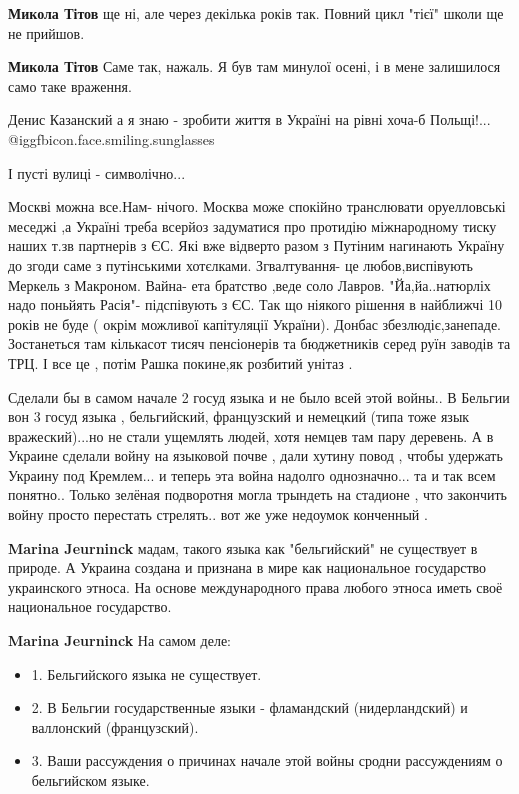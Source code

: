 \begin{itemize}
\begin{itemize} %
\textbf{Микола Тітов} ще ні, але через декілька років так. Повний цикл "тієї" школи ще не прийшов.

\textbf{Микола Тітов} Саме так, нажаль. Я був там минулої осені, і в мене залишилося само таке враження.
\end{itemize} %

Денис Казанский а я знаю - зробити життя в Україні на рівні хоча-б Польщі!... @igg{fbicon.face.smiling.sunglasses} 

І пусті вулиці - символічно...


\obeycr
Москві можна все.Нам- нічого.
Москва може спокійно транслювати оруелловські меседжі
,а Україні треба всерйоз задуматися про протидію міжнародному тиску наших т.зв партнерів з ЄС.
Які вже відверто разом з Путіним нагинають Україну до згоди саме з путінськими хотєлками.
Згвалтування- це любов,виспівують Меркель з Макроном.
Вайна- ета братство ,веде соло Лавров.
"Йа,йа..натюрліх надо поньйять Расія"- підспівують з ЄС.
Так що ніякого рішення в найближчі 10 років не буде ( окрім можливої капітуляції України).
Донбас збезлюдіє,занепаде.
Зостанеться там кількасот тисяч пенсіонерів та бюджетників серед руїн заводів та ТРЦ.
І все це , потім Рашка покине,як розбитий унітаз .
\restorecr


Сделали бы в самом начале 2 госуд языка и не было всей этой войны.. В Бельгии
вон 3 госуд языка , бельгийский, французский и немецкий (типа тоже язык
вражеский)...но не стали ущемлять людей, хотя немцев там пару деревень. А в
Украине сделали войну на языковой почве , дали хутину повод , чтобы удержать
Украину под Кремлем... и теперь эта война надолго однозначно... та и так всем
понятно.. Только зелёная подворотня могла трындеть на стадионе , что закончить
войну просто перестать стрелять.. вот же уже недоумок конченный .

\begin{itemize} %
\textbf{Marina Jeurninck} мадам, такого языка как "бельгийский" не существует в природе. А Украина создана и признана в мире как национальное государство украинского этноса. На основе международного права любого этноса иметь своё национальное государство.

\textbf{Marina Jeurninck} На самом деле:
\begin{itemize}
  \item 1. Бельгийского языка не существует.
  \item 2. В Бельгии государственные языки - фламандский (нидерландский) и валлонский (французский).
  \item 3. Ваши рассуждения о причинах начале этой войны сродни рассуждениям о бельгийском языке.
\end{itemize}


\end{itemize}
\end{itemize}
